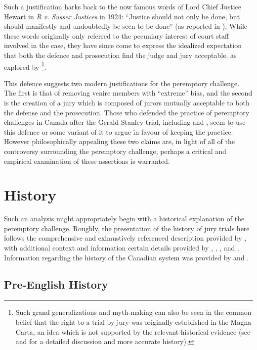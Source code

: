 Such a justification harks back to the now famous words of Lord Chief Justice Hewart in \textit{R v. Sussex Justices} in 1924:
``Justice should not only be done, but should manifestly and undoubtedly be seen to be done'' (as reported in
\cite{oakes2016}). While these words originally only referred to the pecuniary interest of court staff involved in the case, they
have since come to express the idealized expectation that both the defence and prosecution find the judge and jury acceptable, as
explored by \cite{oakes2016}\footnote{Such grand generalizations and myth-making can also be seen in the common belief that the
  right to a trial by jury was originally established in the Magna Carta, an idea which is not supported by the relevant
  historical evidence (see \cite{hoffman1997} and \cite{vandykejurysel} for a detailed discussion and more accurate history).}.

This defence suggests two modern justifications for the peremptory challenge. The first is that of removing venire members with
``extreme'' bias, and the second is the creation of a jury which is composed of jurors mutually acceptable to both the defense and
the prosecution. Those who defended the practice of peremptory challenges in Canada after the Gerald Stanley trial, including
\cite{peremparegood} and \cite{macnabproper}, seem to use this defence or some variant of it to argue in favour of keeping the
practice. However philosophically appealing these two claims are, in light of all of the controversy surrounding the peremptory
challenge, perhaps a critical and empirical examination of these assertions is warranted.

\section{History} \label{sec:history}

Such an analysis might appropriately begin with a historical explanation of the peremptory challenge. Roughly, the presentation of
the history of jury trials here follows the comprehensive and exhaustively referenced description provided by \cite{hoffman1997},
with additional context and information certain details provided by \cite{vonmosch1921}, \cite{forsythhistory}, \cite{brown1978},
and \cite{brown2000}. Information regarding the history of the Canadian system was provided by \cite{brown2000} and
\cite{petersen1993}.

\subsection{Pre-English History}

